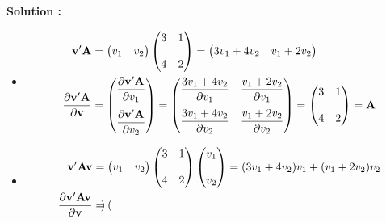 \documentclass[letter, 11pt]{article}
\newcommand{\prof}[1]{\begin{professeur}\color{blue} {\bf Solution :} #1 \end{professeur}}
\begin{document}
\begin{enumerate}[leftmargin=*, wide, label=\bf Exercice \arabic*:]
\prof{ 
    \begin{itemize}
    \item[(a)]  
    \begin{align*}
        \bf{v'A}
        &= \begin{pmatrix}
            v_1 & v_2
        \end{pmatrix}
        \begin{pmatrix}
            3 & 1 \\[4mm]
            4 & 2
        \end{pmatrix}
        = \begin{pmatrix}
            3v_1 + 4v_2 & v_1 + 2v_2
        \end{pmatrix}\\
        \dfrac{\partial \bf{v'A}}{\partial \bf{v}}
        &= \begin{pmatrix}
            \dfrac{\partial \bf{v'A}}{\partial v_1} \\[4mm]
            \dfrac{\partial \bf{v'A}}{\partial v_2}
        \end{pmatrix}
        = \begin{pmatrix}
            \dfrac{ 3v_1 + 4v_2}{\partial v_1} & \dfrac{ v_1 + 2v_2}{\partial v_1} \\[4mm]
            \dfrac{ 3v_1 + 4v_2}{\partial v_2} & \dfrac{ v_1 + 2v_2}{\partial v_2} 
        \end{pmatrix}
        = \begin{pmatrix}
            3 & 1 \\[4mm]
            4 & 2
        \end{pmatrix}
        = \bold A
    \end{align*}
    \item[(b)] \begin{align*}
        \bf{v'Av}
        &= \begin{pmatrix}
            v_1 & v_2
        \end{pmatrix}
        \begin{pmatrix}
            3 & 1 \\[4mm]
            4 & 2
        \end{pmatrix}
        \begin{pmatrix}
            v_1 \\[4mm] v_2
        \end{pmatrix}
        = (3v_1 + 4v_2)v_1 + (v_1 + 2v_2)v_2\\
        \dfrac{\partial \bf{v'Av}}{\partial \bf{v}}
        &= \begin{pmatrix}

\end{pmatrix}
\end{align*}
\end{itemize}}
\end{enumerate}
\end{document}
